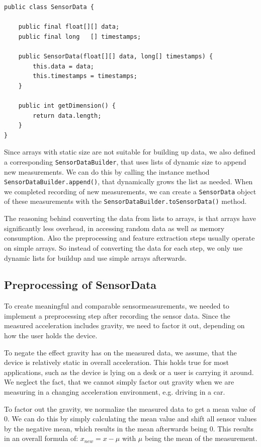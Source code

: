 \begin{lstlisting}[float,
caption={Class \lstinline$SensorData$ containing the raw sensor readings},
label={lst:sensordata}]
public class SensorData {
    
    public final float[][] data;
    public final long   [] timestamps;

    public SensorData(float[][] data, long[] timestamps) {
        this.data = data;
        this.timestamps = timestamps;
    }

    public int getDimension() {
        return data.length;
    }
}
\end{lstlisting}

Since arrays with static size are not suitable for building up data, we also defined a corresponding \lstinline$SensorDataBuilder$, that uses lists of dynamic size to append new measurements. We can do this by calling the instance method \lstinline$SensorDataBuilder.append()$, that dynamically grows the list as needed. When we completed recording of new measurements, we can create a \lstinline$SensorData$ object of these measurements with the \lstinline$SensorDataBuilder.toSensorData()$ method.

The reasoning behind converting the data from lists to arrays, is that arrays have significantly less overhead, in accessing random data as well as memory consumption. Also the preprocessing and feature extraction steps usually operate on simple arrays. So instead of converting the data for each step, we only use dynamic lists for buildup and use simple arrays afterwards.

\subsection{Preprocessing of SensorData}
To create meaningful and comparable sensormeasurements, we needed to implement a preprocessing step after recording the sensor data. Since the measured acceleration includes gravity, we need to factor it out, depending on how the user holds the device.

To negate the effect gravity has on the measured data, we assume, that the device is relatively static in overall acceleration. This holds true for most applications, such as the device is lying on a desk or a user is carrying it around. We neglect the fact, that we cannot simply factor out gravity when we are measuring in a changing acceleration environment, e.g. driving in a car.

To factor out the gravity, we normalize the measured data to get a mean value of 0. We can do this by simply calculating the mean value and shift all sensor values by the negative mean, which results in the mean afterwards being 0. This results in an overall formula of: $ x_{new} = x - \mu $ with $\mu$ being the mean of the measurement.

